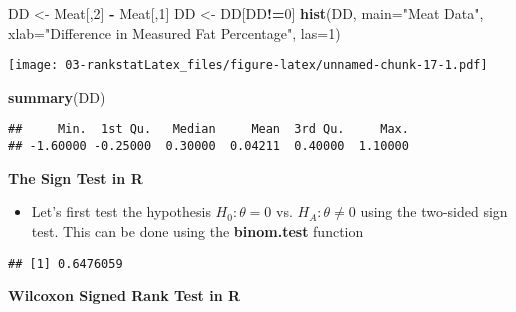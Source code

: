 \documentclass[]{book}
\newenvironment{Shaded}{\begin{snugshade}}{\end{snugshade}}
\newcommand{\DataTypeTok}[1]{\textcolor[rgb]{0.13,0.29,0.53}{#1}}
\newcommand{\DecValTok}[1]{\textcolor[rgb]{0.00,0.00,0.81}{#1}}
\newcommand{\FloatTok}[1]{\textcolor[rgb]{0.00,0.00,0.81}{#1}}
\newcommand{\KeywordTok}[1]{\textcolor[rgb]{0.13,0.29,0.53}{\textbf{#1}}}
\newcommand{\NormalTok}[1]{#1}
\newcommand{\OperatorTok}[1]{\textcolor[rgb]{0.81,0.36,0.00}{\textbf{#1}}}
\newcommand{\StringTok}[1]{\textcolor[rgb]{0.31,0.60,0.02}{#1}}
\providecommand{\tightlist}{%
  \setlength{\itemsep}{0pt}\setlength{\parskip}{0pt}}
\begin{document}
\begin{Shaded}
\begin{Highlighting}[]
\NormalTok{DD <-}\StringTok{ }\NormalTok{Meat[,}\DecValTok{2}\NormalTok{] }\OperatorTok{-}\StringTok{ }\NormalTok{Meat[,}\DecValTok{1}\NormalTok{]}
\NormalTok{DD <-}\StringTok{ }\NormalTok{DD[DD}\OperatorTok{!=}\DecValTok{0}\NormalTok{]}
\KeywordTok{hist}\NormalTok{(DD, }\DataTypeTok{main=}\StringTok{"Meat Data"}\NormalTok{, }\DataTypeTok{xlab=}\StringTok{"Difference in Measured Fat Percentage"}\NormalTok{, }\DataTypeTok{las=}\DecValTok{1}\NormalTok{)}
\end{Highlighting}
\end{Shaded}

\texttt{[image: 03-rankstatLatex\_files/figure-latex/unnamed-chunk-17-1.pdf]}

\begin{Shaded}
\begin{Highlighting}[]
\KeywordTok{summary}\NormalTok{(DD)}
\end{Highlighting}
\end{Shaded}

\begin{verbatim}
##     Min.  1st Qu.   Median     Mean  3rd Qu.     Max. 
## -1.60000 -0.25000  0.30000  0.04211  0.40000  1.10000
\end{verbatim}

\textbf{The Sign Test in R}

\begin{itemize}
\tightlist
\item
  Let's first test the hypothesis \(H_{0}: \theta = 0\) vs. \(H_{A}: \theta \neq 0\) using
  the two-sided sign test. This can be done using the \textbf{binom.test} function
\end{itemize}

\begin{Shaded}
\end{Shaded}

\begin{verbatim}
## [1] 0.6476059
\end{verbatim}

\textbf{Wilcoxon Signed Rank Test in R}
\end{document}
